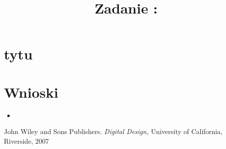 \documentclass{classrep}
\author{
  \studentinfo{Witold Olechowski}{127517} \and
  \studentinfo{Tomasz Marecik}{127374}
}
\title{Zadanie : }
\begin{document}
\maketitle

\section{tytu}

\section{Wnioski}
\begin{itemize}
	\item 
\end{itemize}

\begin{thebibliography}{0}
   John Wiley and Sons Publishers.
    \textsl{Digital Design,} University of California, Riverside, 2007
\end{thebibliography}
\end{document}
